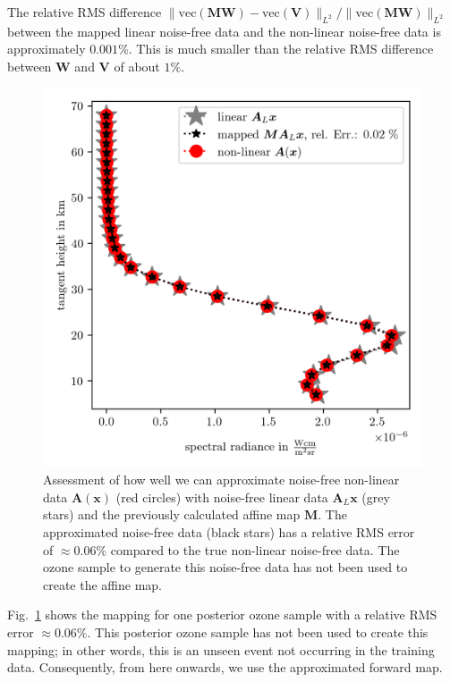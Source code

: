 
The relative RMS difference $\lVert \text{vec}(\bm{M}\bm{W}) - \text{vec}(\bm{V})  \rVert_{L^2} / \lVert \text{vec}(\bm{M}\bm{W}) \rVert_{L^2} $ between the mapped linear noise-free data and the non-linear noise-free data is approximately $0.001\%$.
This is much smaller than the relative RMS difference between $\bm{W}$ and $\bm{V}$ of about $1\%$.
\begin{figure}[t!]
	\centering
	\includegraphics{SampMapAssesmentTT.png}
	\caption[Assessment of affine map.]{Assessment of how well we can approximate noise-free non-linear data $\bm{A}(\bm{x})$  (red circles) with noise-free linear data $\bm{A}_L\bm{x}$ (grey stars) and the previously calculated affine map $\bm{M}$. The approximated noise-free data (black stars) has a relative RMS error of $\approx 0.06\%$ compared to the true non-linear noise-free data.
		The ozone sample to generate this noise-free data has not been used to create the affine map.}
	\label{fig:MapAsses}
\end{figure}
Fig.~\ref{fig:MapAsses} shows the mapping for one posterior ozone sample with a relative RMS error $\approx0.06\%$.
This posterior ozone sample has not been used to create this mapping; in other words, this is an unseen event not occurring in the training data.
Consequently, from here onwards, we use the approximated forward map.
